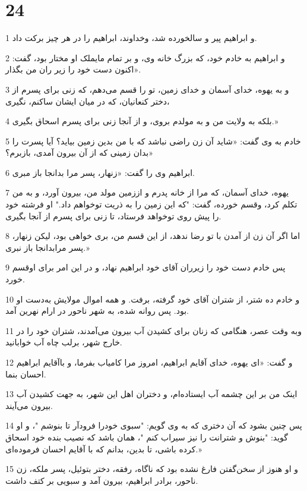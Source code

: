 \chapter{24}

\par 1 و ابراهیم پیر و سالخورده شد، وخداوند، ابراهیم را در هر چیز برکت داد.
\par 2 و ابراهیم به خادم خود، که بزرگ خانه وی، و بر تمام مایملک او مختار بود، گفت: «اکنون دست خود را زیر ران من بگذار.
\par 3 و به یهوه، خدای آسمان و خدای زمین، تو را قسم می‌دهم، که زنی برای پسرم از دختر کنعانیان، که در میان ایشان ساکنم، نگیری،
\par 4 بلکه به ولایت من و به مولدم بروی، و از آنجا زنی برای پسرم اسحاق بگیری.»
\par 5 خادم به وی گفت: «شاید آن زن راضی نباشد که با من بدین زمین بیاید؟ آیا پسرت را بدان زمینی که از آن بیرون آمدی، بازبرم؟»
\par 6 ابراهیم وی را گفت: «زنهار، پسر مرا بدانجا باز مبری.
\par 7 یهوه، خدای آسمان، که مرا از خانه پدرم و اززمین مولد من، بیرون آورد، و به من تکلم کرد، وقسم خورده، گفت: "که این زمین را به ذریت توخواهم داد." او فرشته خود را پیش روی توخواهد فرستاد، تا زنی برای پسرم از آنجا بگیری.
\par 8 اما اگر آن زن از آمدن با تو رضا ندهد، از این قسم من، بری خواهی بود، لیکن زنهار، پسر مرابدانجا باز نبری.»
\par 9 پس خادم دست خود را زیرران آقای خود ابراهیم نهاد، و در این امر برای اوقسم خورد.
\par 10 و خادم ده شتر، از شتران آقای خود گرفته، برفت. و همه اموال مولایش به‌دست او بود. پس روانه شده، به شهر ناحور در ارام نهرین آمد.
\par 11 وبه وقت عصر، هنگامی که زنان برای کشیدن آب بیرون می‌آمدند، شتران خود را در خارج شهر، برلب چاه آب خوابانید.
\par 12 و گفت: «ای یهوه، خدای آقایم ابراهیم، امروز مرا کامیاب بفرما، و باآقایم ابراهیم احسان بنما.
\par 13 اینک من بر این چشمه آب ایستاده‌ام، و دختران اهل این شهر، به جهت کشیدن آب بیرون می‌آیند.
\par 14 پس چنین بشود که آن دختری که به وی گویم: "سبوی خودرا فرودآر تا بنوشم "، و او گوید: "بنوش و شترانت را نیز سیراب کنم "، همان باشد که نصیب بنده خود اسحاق کرده باشی، تا بدین، بدانم که با آقایم احسان فرموده‌ای.»
\par 15 و او هنوز از سخن‌گفتن فارغ نشده بود که ناگاه، رفقه، دختر بتوئیل، پسر ملکه، زن ناحور، برادر ابراهیم، بیرون آمد و سبویی بر کتف داشت.
